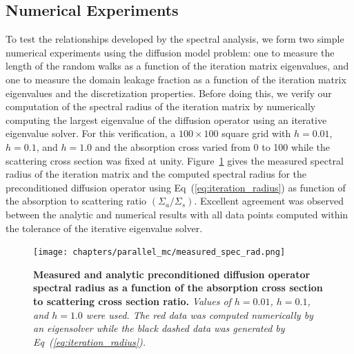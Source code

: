 \subsection{Numerical Experiments}
\label{subsec:numerical_experiments}
To test the relationships developed by the spectral analysis, we form
two simple numerical experiments using the diffusion model problem:
one to measure the length of the random walks as a function of the
iteration matrix eigenvalues, and one to measure the domain leakage
fraction as a function of the iteration matrix eigenvalues and the
discretization properties. Before doing this, we verify our
computation of the spectral radius of the iteration matrix by
numerically computing the largest eigenvalue of the diffusion operator
using an iterative eigenvalue solver. For this verification, a $100
\times 100$ square grid with $h=0.01$, $h=0.1$, and $h=1.0$ and the
absorption cross varied from 0 to 100 while the scattering cross
section was fixed at unity. Figure~\ref{fig:measured_spec_rad} gives
the measured spectral radius of the iteration matrix and the computed
spectral radius for the preconditioned diffusion operator using
Eq~(\ref{eq:iteration_radius}) as function of the absorption to
scattering ratio $(\Sigma_a / \Sigma_s)$. Excellent agreement was
observed between the analytic and numerical results with all data
points computed within the tolerance of the iterative eigenvalue
solver.
\begin{figure}[t!]
  \begin{spacing}{1.0}
    \begin{center}
      \texttt{[image: chapters/parallel\_mc/measured\_spec\_rad.png]}
    \end{center}
    \caption{\textbf{Measured and analytic preconditioned diffusion
        operator spectral radius as a function of the absorption cross
        section to scattering cross section ratio.} \textit{Values of
        $h=0.01$, $h=0.1$, and $h=1.0$ were used. The red data was
        computed numerically by an eigensolver while the black dashed
        data was generated by Eq~(\ref{eq:iteration_radius}).}}
    \label{fig:measured_spec_rad}
  \end{spacing}
\end{figure}

